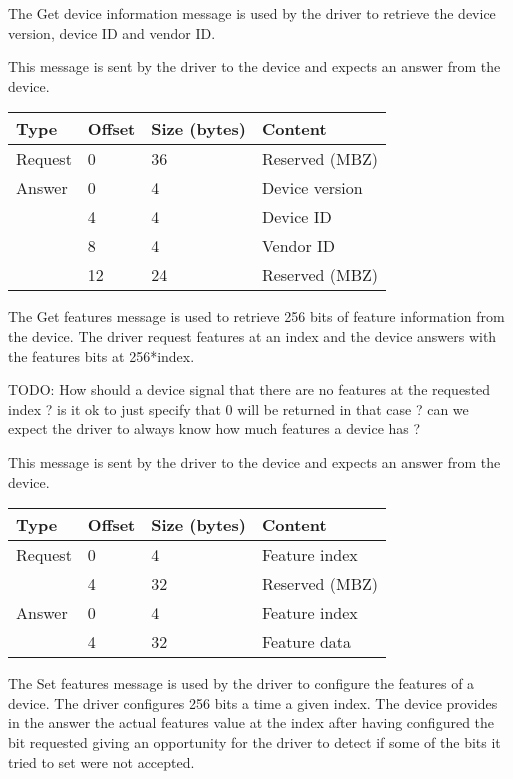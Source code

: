 The Get device information message is used by the driver to retrieve the device
version, device ID and vendor ID.

This message is sent by the driver to the device and expects an answer from the
device.

\begin{tabular}{|l|l|l|l|}
\hline
Type & Offset & Size (bytes) & Content \\
\hline \hline
Request & 0 & 36 & Reserved (MBZ) \\
\hline
Answer & 0 & 4 & Device version \\
& 4 & 4 & Device ID \\
& 8 & 4 & Vendor ID \\
& 12 & 24 & Reserved (MBZ) \\
\hline
\end{tabular}


The Get features message is used to retrieve 256 bits of feature information
from the device. The driver request features at an index and the device answers
with the features bits at 256*index.

TODO: How should a device signal that there are no features at the requested
 index ? is it ok to just specify that 0 will be returned in that case ? can
 we expect the driver to always know how much features a device has ?

This message is sent by the driver to the device and expects an answer from the
device.

\begin{tabular}{|l|l|l|l|}
\hline
Type & Offset & Size (bytes) & Content \\
\hline \hline
Request & 0 & 4 & Feature index \\
& 4 & 32 & Reserved (MBZ) \\
\hline
Answer & 0 & 4 & Feature index \\
& 4 & 32 & Feature data \\
\hline
\end{tabular}


The Set features message is used by the driver to configure the features of a
device. The driver configures 256 bits a time a given index. The device
provides in the answer the actual features value at the index after having
configured the bit requested giving an opportunity for the driver to detect if
some of the bits it tried to set were not accepted.


